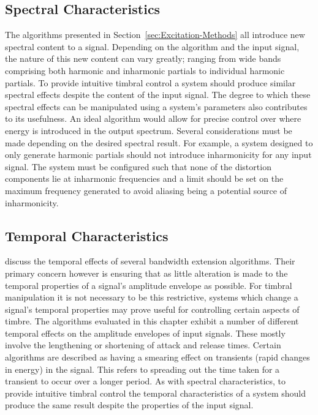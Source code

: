 	\subsection{Spectral Characteristics}
	\label{sec:ExcitationEvaluation-Evaluation-SpectralCharacteristics}
		The algorithms presented in Section~\ref{sec:Excitation-Methods} all introduce new spectral content to a
		signal. Depending on the algorithm and the input signal, the nature of this new content can vary greatly;
		ranging from wide bands comprising both harmonic and inharmonic partials to individual harmonic partials.
		To provide intuitive timbral control a system should produce similar spectral effects despite the content
		of the input signal. The degree to which these spectral effects can be manipulated using a system's
		parameters also contributes to its usefulness. An ideal algorithm would allow for precise control over
		where energy is introduced in the output spectrum. Several considerations must be made depending on the
		desired spectral result. For example, a system designed to only generate harmonic partials should not
		introduce inharmonicity for any input signal. The system must be configured such that none of the
		distortion components lie at inharmonic frequencies and a limit should be set on the maximum frequency
		generated to avoid aliasing being a potential source of inharmonicity.

	\subsection{Temporal Characteristics}
	\label{sec:ExcitationEvaluation-Evaluation-TemporalCharacteristics}		
		\citet{larsen2004audio} discuss the temporal effects of several bandwidth extension algorithms. Their
		primary concern however is ensuring that as little alteration is made to the temporal properties of a
		signal's amplitude envelope as possible. For timbral manipulation it is not necessary to be this
		restrictive, systems which change a signal's temporal properties may prove useful for controlling certain
		aspects of timbre. The algorithms evaluated in this chapter exhibit a number of different temporal effects
		on the amplitude envelopes of input signals. These mostly involve the lengthening or shortening of attack
		and release times.  Certain algorithms are described as having a smearing effect on transients (rapid
		changes in energy) in the signal. This refers to spreading out the time taken for a transient to occur over
		a longer period. As with spectral characteristics, to provide intuitive timbral control the temporal
		characteristics of a system should produce the same result despite the properties of the input signal.

